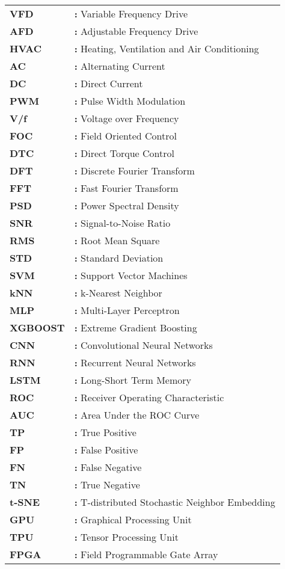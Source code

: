 \begin{tabular}{@{}p{2cm}l}
{\bf{VFD}} & {\bf:} Variable Frequency Drive\\
{\bf AFD} & {\bf:} Adjustable Frequency Drive\\
{\bf HVAC} & {\bf:} Heating, Ventilation and Air Conditioning\\
{\bf AC} & {\bf:} Alternating Current\\
{\bf DC} & {\bf:} Direct Current\\
{\bf PWM} & {\bf:} Pulse Width Modulation\\
{\bf V/f} & {\bf:} Voltage over Frequency\\
{\bf FOC} & {\bf:} Field Oriented Control\\
{\bf DTC} & {\bf:} Direct Torque Control\\
{\bf DFT} & {\bf:} Discrete Fourier Transform\\
{\bf FFT} & {\bf:} Fast Fourier Transform\\
{\bf PSD} & {\bf:} Power Spectral Density\\
{\bf SNR} & {\bf:} Signal-to-Noise Ratio\\
{\bf RMS} & {\bf:} Root Mean Square\\
{\bf STD} & {\bf:} Standard Deviation\\
{\bf SVM} & {\bf:} Support Vector Machines\\
{\bf kNN} & {\bf:} k-Nearest Neighbor\\
{\bf MLP} & {\bf:} Multi-Layer Perceptron\\
{\bf XGBOOST} & {\bf:} Extreme Gradient Boosting\\
{\bf CNN} & {\bf:} Convolutional Neural Networks\\
{\bf RNN} & {\bf:} Recurrent Neural Networks\\
{\bf LSTM} & {\bf:} Long-Short Term Memory\\
{\bf ROC} & {\bf:} Receiver Operating Characteristic\\
{\bf AUC} & {\bf:} Area Under the ROC Curve\\
{\bf TP} & {\bf:} True Positive\\
{\bf FP} & {\bf:} False Positive\\
{\bf FN} & {\bf:} False Negative\\
{\bf TN} & {\bf:} True Negative\\
{\bf t-SNE} & {\bf:} T-distributed Stochastic Neighbor Embedding\\
{\bf GPU} & {\bf:} Graphical Processing Unit\\
{\bf TPU} & {\bf:} Tensor Processing Unit\\
{\bf FPGA} & {\bf:} Field Programmable Gate Array\\
\end{tabular}

